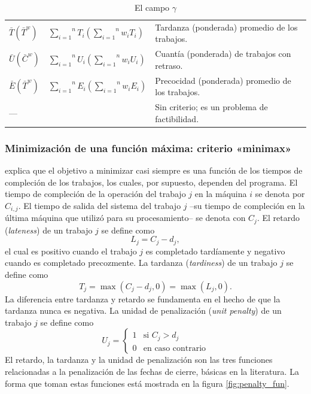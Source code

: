 \documentclass[spanish,draft,12pt,headsepline,footsepline,paper=letter]{scrreprt}
\begin{document}
\begin{table}
\begin{tabular}{l l p{8cm}}
  $\bar{T} (\bar{T}^w)$ & $\overset{n}{\underset{i=1}{\sum}}T_i (\overset{n}{\underset{i=1}{\sum}}w_iT_i)$ & Tardanza (ponderada) promedio de los trabajos.                                                                                    \\
  $\bar{U} (\bar{C}^w)$ & $\overset{n}{\underset{i=1}{\sum}}U_i (\overset{n}{\underset{i=1}{\sum}}w_iU_i)$ & Cuantía (ponderada) de trabajos con retraso.                                                                                      \\[12pt]
  $\bar{E} (\bar{T}^w)$ & $\overset{n}{\underset{i=1}{\sum}}E_i (\overset{n}{\underset{i=1}{\sum}}w_iE_i)$ & Precocidad (ponderada) promedio de los trabajos.                                                                                  \\
  — & & Sin criterio; es un problema de factibilidad.    \\
  \bottomrule
\end{tabular}
\caption{El campo $\gamma$}
\label{tab:notation_gamma}
\end{table}

\subsubsection[Criterio «minimax»]{Minimización de una función máxima: criterio «minimax»}

\citet[p.~18]{Pinedo1995} explica que el objetivo a minimizar casi siempre es una función de los tiempos de compleción de los trabajos, los cuales, por supuesto, dependen del programa. 
El tiempo de compleción de la operación del trabajo $j$ en la máquina $i$ se denota por $C_{i,j}$. El tiempo de salida del sistema del trabajo $j$ –su tiempo de compleción en la última máquina que utilizó para su procesamiento– se denota con $C_j$.
%
El retardo (\textit{lateness}) de un trabajo $j$ se define como 
\[ L_j = C_j - d_j, \]
el cual es positivo cuando el trabajo $j$ es completado tardíamente y negativo cuando es completado precozmente. La tardanza (\textit{tardiness}) de un trabajo $j$ se define como
\[ T_j = \max(C_j - d_j, 0) = \max(L_j, 0). \]
La diferencia entre tardanza y retardo se fundamenta en el hecho de que la tardanza nunca es negativa. La unidad de penalización (\textit{unit penalty}) de un trabajo $j$ se define como
\[ U_j = \left\{
    \begin{array}{ll}
      1 & \mbox{si } C_j > d_j \\
      0 & \mbox{en caso contrario}
    \end{array}
  \right. \]
El retardo, la tardanza y la unidad de penalización son las tres funciones relacionadas a la penalización de las fechas de cierre, básicas en la literatura. La forma que toman estas funciones está mostrada en la figura \ref{fig:penalty_fun}.
\end{document}
